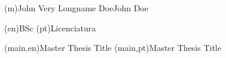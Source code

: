
%



\ncauthorname(m){John Very Longname Doe}{John Doe}


\ncauthordegree(en){BSc}
\ncauthordegree(pt){Licenciatura}




\nctitle(main,en){Master Thesis Title}%
\nctitle(main,pt){Master Thesis Title}%



